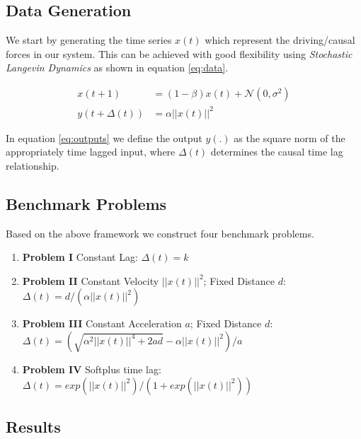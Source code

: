 \documentclass[twoside]{article}
\begin{document}
\subsection{Data Generation}

We start by generating the time series $x(t)$ which represent the driving/causal
forces in our system. This can be achieved with good flexibility using 
\emph{Stochastic Langevin Dynamics} as shown in equation \ref{eq:data}. 

\begin{align}
 x(t+1) &= (1 - \beta) x(t) + \mathcal{N}(0, \sigma^2) \label{eq:data}\\
 y(t+\Delta(t)) &= \alpha ||x(t)||^2 \label{eq:outputs}
\end{align}

In equation \ref{eq:outputs} we define the output $y(.)$ as the square norm
of the appropriately time lagged input, where $\Delta(t)$ determines the causal
time lag relationship.

\subsection{Benchmark Problems}\label{sec:benchmark}

Based on the above framework we construct four benchmark problems.

\begin{enumerate}
\item \textbf{Problem I} Constant Lag: \newline 
$\Delta(t) = k$

\item \textbf{Problem II} Constant Velocity $||x(t)||^2$; Fixed Distance $d$: 
\newline $\Delta(t) = d/(\alpha ||x(t)||^2)$

\item \textbf{Problem III} Constant Acceleration $a$; Fixed Distance $d$: 
\newline $\Delta(t) = (\sqrt{\alpha^2||x(t)||^4 + 2ad} - \alpha||x(t)||^2)/a$

\item \textbf{Problem IV} Softplus time lag: 
\newline $\Delta(t) = exp\left(||x(t)||^2\right)/\left(1 + exp(||x(t)||^2)\right)$

\end{enumerate}

\subsection{Results}
\end{document}

